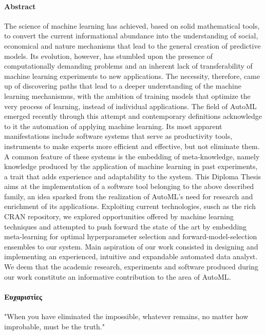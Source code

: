 {	\paragraph{Abstract}
	The science of machine learning has achieved, based on solid mathematical tools, to convert the current informational abundance into the understanding of social, economical and nature mechanisms that lead to the general creation of predictive models. Its evolution, however, has stumbled upon  the presence of computationally demanding problems and an inherent lack of transferability of machine learning experiments to new applications. The necessity, therefore, came up of discovering paths that lead to a deeper understanding of the machine learning mecha\-nismus, with the ambition of training models that optimize the very process of learning, instead of individual applications. The field of \gls{AutoML} emerged recently through this attempt and contempo\-rary definitions acknowledge to it the automation of applying machine learning. Its most apparent manifestations  include software systems that serve as productivity tools, instruments to make experts more efficient and effective, but not eliminate them. A common feature of these systems is the embedding of meta-knowledge, namely knowledge produced by the application of machine learning in past experiments, a trait that adds experience and adaptability to the system. This Diploma Thesis aims at the implementation of a software tool belonging to the above described family, an idea sparked from the realization of \gls{AutoML}'s need for research and enrichment of its applications. Exploiting current technologies, susch as the rich CRAN repository, we explored opportunities offered by machine learning techniques and attempted to push forward the state of the art by embedding meta-learning for optimal hyperparameter selection and forward-model-selection ensembles to our system. Main aspiration of our work consisted in designing and implementing an experienced, intuitive and expandable automated data analyst. We deem that the academic research, experiments and software produced during our work constitute an informa\-tive contribu\-tion to the area of \gls{AutoML}.       
	\newpage
	\paragraph{Ευχαριστίες}
	\newpage
}


\tableofcontents
\listoffigures
\listoftables

\pagebreak
\thispagestyle{empty}
\hspace{0pt}
\vfill
\begin{flushright}
"When you have eliminated the impossible, whatever remains, no matter how improbable, must be the truth."
\\[8pt]
\end{flushright}
\vfill
\hspace{0pt}
\pagebreak





